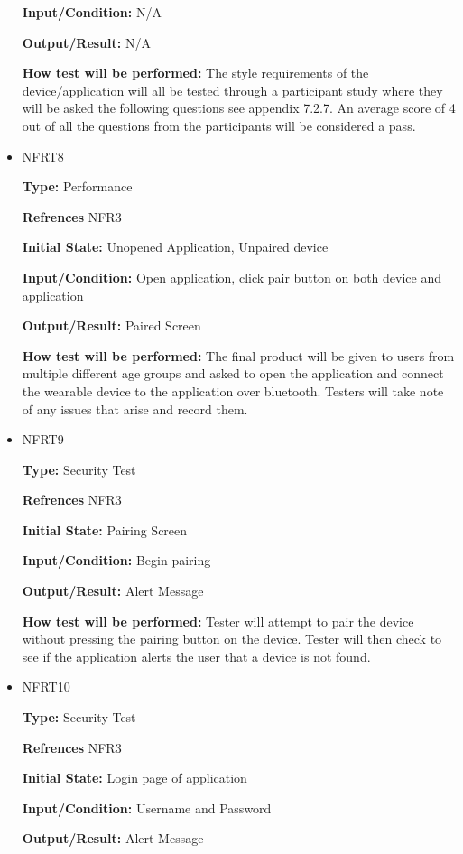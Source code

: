 \documentclass[12pt, titlepage]{article}
\begin{document}
\begin{itemize}
\textbf{Input/Condition:} N/A
					
\textbf{Output/Result:} N/A
					
\textbf{How test will be performed:} The style requirements of the device/application will all be tested through a participant study where they will be asked the following questions see appendix 7.2.7. An average score of 4 out of all the questions from the participants will be considered a pass.

\item{NFRT8}

\textbf{Type:} Performance

\textbf{Refrences} NFR3
					
\textbf{Initial State:} Unopened Application, Unpaired device
					
\textbf{Input/Condition:} Open application, click pair button on both device and application
					
\textbf{Output/Result:} Paired Screen
					
\textbf{How test will be performed:} The final product will be given to users from multiple different age groups and asked to open the application and connect the wearable device to the application over bluetooth. Testers will take note of any issues that arise and record them.

\item{NFRT9}

\textbf{Type:} Security Test

\textbf{Refrences} NFR3
					
\textbf{Initial State:} Pairing Screen
					
\textbf{Input/Condition:} Begin pairing
					
\textbf{Output/Result:} Alert Message
					
\textbf{How test will be performed:} Tester will attempt to pair the device without pressing the pairing button on the device. Tester will then check to see if the application alerts the user that a device is not found.

\item{NFRT10}

\textbf{Type:} Security Test

\textbf{Refrences} NFR3
					
\textbf{Initial State:} Login page of application
					
\textbf{Input/Condition:} Username and Password
					
\textbf{Output/Result:} Alert Message
					

\end{itemize}
\end{document}

